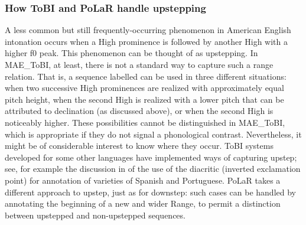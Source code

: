 \subsubsection{How ToBI and PoLaR handle upstepping}\label{sec:upstepping}
A less common but still frequently-occurring phenomenon in American English intonation occurs when a High prominence is followed by another High with a higher f0 peak.  This phenomenon can be thought of as upstepping. In MAE\_ToBI, at least, there is not a standard way to capture such a range relation.  That is, a sequence labelled  can be used in three different situations: when two successive High prominences are realized with approximately equal pitch height, when the second High is realized with a lower pitch that can be attributed to declination (as discussed above), or when the second High is noticeably higher. These possibilities cannot be distinguished in MAE\_ToBI, which is appropriate if they do not signal a phonological contrast. Nevertheless, it might be of considerable interest to know where they occur. ToBI systems developed for some other languages have implemented ways of capturing upstep; see, for example the discussion in \citet{armstrong-14} of the use of the  diacritic (inverted exclamation point) for annotation of varieties of Spanish and Portuguese. PoLaR takes a different approach to upstep, just as for downstep: such cases can be handled by annotating the beginning of a new and wider Range, to permit a distinction between upstepped and non-upstepped sequences.

